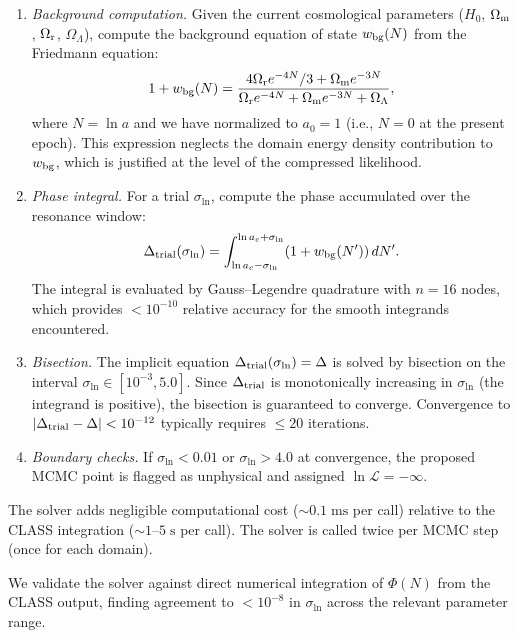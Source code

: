 \documentclass[aps,prd,twocolumn,superscriptaddress,nofootinbib]{revtex4-2}
\newcommand{\Om}{\Omega_{\rm m}}
\newcommand{\Or}{\Omega_{\rm r}}
\newcommand{\OL}{\Omega_\Lambda}
\newcommand{\sln}{\sigma_{\ln}}
\newcommand{\Hubble}{H_0}
\begin{document}
\begin{enumerate}
\item \textit{Background computation.} Given the current cosmological
  parameters ($\Hubble$, $\Om$, $\Or$, $\OL$), compute the background
  equation of state $w_{\rm bg}(N)$ from the Friedmann equation:
  \begin{equation}
  1 + w_{\rm bg}(N) = \frac{4\Or e^{-4N}/3 + \Om e^{-3N}}
    {\Or e^{-4N} + \Om e^{-3N} + \OL},
  \label{eq:w_bg}
  \end{equation}
  where $N = \ln a$ and we have normalized to $a_0 = 1$ (i.e.,
  $N = 0$ at the present epoch). This expression neglects the domain
  energy density contribution to $w_{\rm bg}$, which is justified at
  the level of the compressed likelihood.

\item \textit{Phase integral.} For a trial $\sln$, compute the phase
  accumulated over the resonance window:
  \begin{equation}
  \Delta_{\rm trial}(\sln) = \int_{\ln a_c - \sln}^{\ln a_c + \sln}
    (1 + w_{\rm bg}(N'))\, dN'.
  \label{eq:phase_trial}
  \end{equation}
  The integral is evaluated by Gauss--Legendre quadrature with $n = 16$
  nodes, which provides $< 10^{-10}$ relative accuracy for the smooth
  integrands encountered.

\item \textit{Bisection.} The implicit equation $\Delta_{\rm
  trial}(\sln) = \Delta$ is solved by bisection on the interval
  $\sln \in [10^{-3}, 5.0]$. Since $\Delta_{\rm trial}$ is monotonically
  increasing in $\sln$ (the integrand is positive), the bisection is
  guaranteed to converge. Convergence to $|\Delta_{\rm trial} - \Delta|
  < 10^{-12}$ typically requires $\leq 20$ iterations.

\item \textit{Boundary checks.} If $\sln < 0.01$ or $\sln > 4.0$ at
  convergence, the proposed MCMC point is flagged as unphysical and
  assigned $\ln \mathcal{L} = -\infty$.
\end{enumerate}

The solver adds negligible computational cost ($\sim 0.1\;\mathrm{ms}$
per call) relative to the CLASS integration
($\sim 1$--$5\;\mathrm{s}$ per call). The solver is called twice per
MCMC step (once for each domain).

We validate the solver against direct numerical integration of
$\Phi(N)$ from the CLASS output, finding agreement to $< 10^{-8}$ in
$\sln$ across the relevant parameter range.
\end{document}
